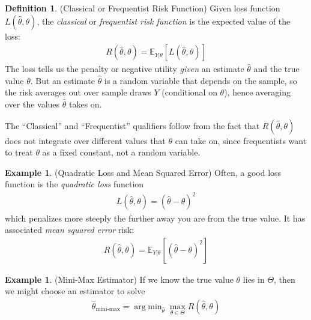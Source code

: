 \documentclass[12pt]{article}
\theoremstyle{plain}
\theoremstyle{definition}
\newtheorem{defn}[thm]{Definition}
\newtheorem{ex}[thm]{Example}
\theoremstyle{remark}
\newtheorem*{rmk}{Remark}
\newcommand{\E}{\mathbb{E}}
\DeclareMathOperator*{\argmin}{arg\;min}
\begin{document}
\begin{defn}{(Classical or Frequentist Risk Function)}
Given loss function $L(\hat{\theta},\theta)$, the \emph{classical} or
\emph{frequentist risk function} is the expected value of the loss:
\begin{align*}
  R(\hat{\theta},\theta) = \E_{Y|\theta}[L(\hat{\theta},\theta)]
\end{align*}
The loss tells us the penalty or negative utility \emph{given} an
estimate $\hat{\theta}$ and the true value $\theta$. But an estimate
$\hat{\theta}$ is a random variable that depends on the sample, so the
risk averages out over sample draws $Y$ (conditional on $\theta$),
hence averaging over the values $\hat{\theta}$ takes on.

The ``Classical'' and ``Frequentist'' qualifiers follow from the fact
that $R(\hat{\theta},\theta)$ does not integrate over different values
that $\theta$ can take on, since frequentists want to treat $\theta$ as
a fixed constant, not a random variable.
\end{defn}

\begin{ex}(Quadratic Loss and Mean Squared Error)
Often, a good loss function is the \emph{quadratic loss} function
\begin{align*}
  L(\hat{\theta},\theta) = (\hat{\theta}-\theta)^2
\end{align*}
which penalizes more steeply the further away you are from the true
value. It has associated \emph{mean squared error} risk:
\begin{align*}
  R(\hat{\theta},\theta) = \E_{Y|\theta}[(\hat{\theta}-\theta)^2]
\end{align*}
\end{ex}

\begin{ex}(Mini-Max Estimator)
If we know the true value $\theta$ lies in $\Theta$, then we might
choose an estimator to solve
\begin{align*}
  \hat{\theta}_{\text{mini-max}}
  =
  \argmin_{\hat{\theta}} \max_{\theta \in \Theta} R(\hat{\theta},\theta)
\end{align*}
\end{ex}
\end{document}
